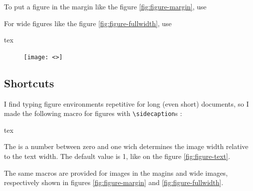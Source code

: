 To put a figure in the margin like the figure \ref{fig:figure-margin}, use



For wide figures like the figure \ref{fig:figure-fullwidth}, use

\begin{codebox}{tex}
    \begin{figure}
        \texttt{[image: <>]} %
    \end{figure}
\end{codebox}

\newpage



\subsection{Shortcuts}

I find typing figure environments repetitive for long (even short) documents, so I made the following macro for figures with \texttt{\textbackslash sidecaption}s :

\begin{codebox}{tex}
\end{codebox}

The  is a number between zero and one wich determines the image width relative to the text width. The default value is 1, like on the figure \ref{fig:figure-text}.

The same macros are provided for images in the magins and wide images, respectively shown in figures \ref{fig:figure-margin} and \ref{fig:figure-fullwidth}.

